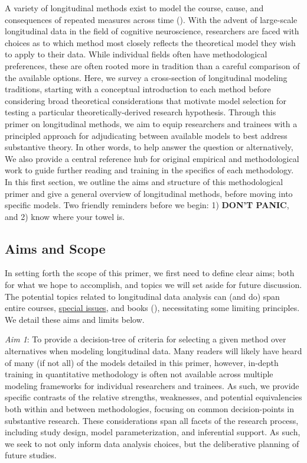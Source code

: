 \documentclass[11pt]{article}
\begin{document}
A variety of longitudinal methods exist to model the course, cause, and consequences of repeated measures across time (\cite{curran_twelve_2010}). With the advent of large-scale longitudinal data in the field of cognitive neuroscience, researchers are faced with choices as to which method most closely reflects the theoretical model they wish to apply to their data. While individual fields often have methodological preferences, these are often rooted more in tradition than a careful comparison of the available options. Here, we survey a cross-section of longitudinal modeling traditions, starting with a conceptual introduction to each method before considering broad theoretical considerations that motivate model selection for testing a particular theoretically-derived research hypothesis. Through this primer on longitudinal methods, we aim to equip researchers and trainees with a principled approach for adjudicating between available models to best address substantive theory. In other words, to help answer the question  or alternatively,  We also provide a central reference hub for original empirical and methodological work to guide further reading and training in the specifics of each methodology. In this first section, we outline the aims and structure of this methodological primer and give a general overview of longitudinal methods, before moving into specific models. Two friendly reminders before we begin: 1) \textbf{DON’T PANIC}, and 2) know where your towel is.

\subsection{Aims and Scope}
In setting forth the scope of this primer, we first need to define clear aims; both for what we hope to accomplish, and topics we will set aside for future discussion. The potential topics related to longitudinal data analysis can (and do) span entire courses, \href{https://www.sciencedirect.com/journal/developmental-cognitive-neuroscience/vol/33}{special issues}, and books (\cite{hedeker_longitudinal_2006, singer_applied_2003,bollen_latent_2006}), necessitating some limiting principles. We detail these aims and limits below.

\textit{Aim 1}: To provide a decision-tree of criteria for selecting a given method over alternatives when modeling longitudinal data. Many readers will likely have heard of many (if not all) of the models detailed in this primer, however, in-depth training in quantitative methodology is often not available across multiple modeling frameworks for individual researchers and trainees. As such, we provide specific contrasts of the relative strengths, weaknesses, and potential equivalencies both within and between methodologies, focusing on common decision-points in substantive research. These considerations span all facets of the research process, including study design, model parameterization, and inferential support. As such, we seek to not only inform data analysis choices, but the deliberative planning of future studies.
\end{document}
